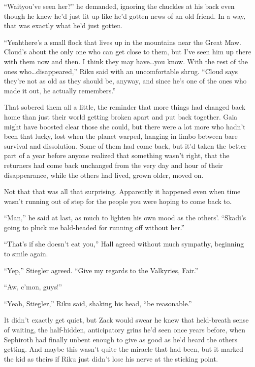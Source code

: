 ``Wait\textemdash you've seen her?'' he demanded, ignoring the chuckles at his back even though he knew he'd just lit up like he'd gotten news of an old friend. In a way, that was exactly what he'd just gotten.

``Yeah\textemdash there's a small flock that lives up in the mountains near the Great Maw. Cloud's about the only one who can get close to them, but I've seen him up there with them now and then. I think they may have\ldots you know. With the rest of the ones who\ldots disappeared,'' Riku said with an uncomfortable shrug. ``Cloud says they're not as old as they should be, anyway, and since he's one of the ones who made it out, he actually remembers.''

That sobered them all a little, the reminder that more things had changed back home than just their world getting broken apart and put back together. Gaia might have boosted clear those she could, but there were a lot more who hadn't been that lucky, lost when the planet warped, hanging in limbo between bare survival and dissolution. Some of them had come back, but it'd taken the better part of a year before anyone realized that something wasn't right, that the returners had come back unchanged from the very day and hour of their disappearance, while the others had lived, grown older, moved on.

Not that that was all that surprising. Apparently it happened even when time wasn't running out of step for the people you were hoping to come back to.

``Man,'' he said at last, as much to lighten his own mood as the others'. ``Skadi's going to pluck me bald-headed for running off without her.''

``That's if she doesn't eat you,'' Hall agreed without much sympathy, beginning to smile again.

``Yep,'' Stiegler agreed. ``Give my regards to the Valkyries, Fair.''

``Aw, c'mon, guys!''

``Yeah, Stiegler,'' Riku said, shaking his head, ``be reasonable.''

It didn't exactly get quiet, but Zack would swear he knew that held-breath sense of waiting, the half-hidden, anticipatory grins he'd seen once years before, when Sephiroth had finally unbent enough to give as good as he'd heard the others getting. And maybe this wasn't quite the miracle that had been, but it marked the kid as theirs if Riku just didn't lose his nerve at the sticking point.

